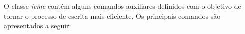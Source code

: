 O classe \textit{icmc} contém alguns comandos auxiliares definidos com o objetivo de tornar o processo de escrita mais eficiente. Os principais comandos são apresentados a seguir:

\begin{description}
    
    \item[]
    \item[]
    \item[]
    \item[]
    \item[]
    \item[]
    \item[]
    \item[]
    \item[]
    \item[]
    
\end{description}